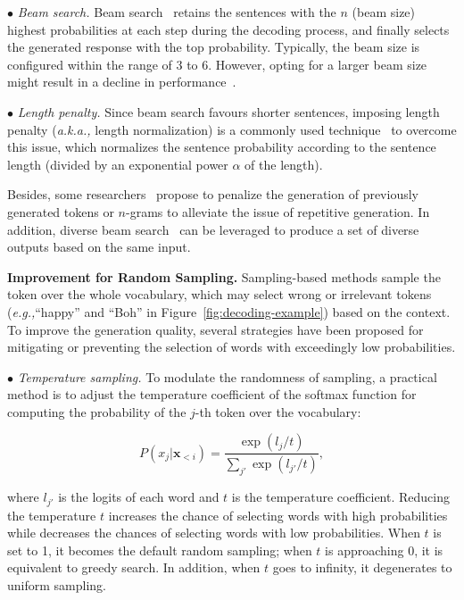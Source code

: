 $\bullet$ \emph{Beam search.} Beam search~\cite{CMU-book-1977-speech} retains the sentences with the $n$ (beam size) highest probabilities at each step during the decoding process, and finally selects the generated response with the top probability. Typically, the beam size is configured within the range of 3 to 6. However, opting for a larger beam size might result in a decline in performance~\cite{Koehn-ACL-2017-Six}.

$\bullet$ \emph{Length penalty.} Since beam search favours shorter sentences, imposing length penalty (\emph{a.k.a.,} length normalization) is a commonly used technique~\cite{Wu-arxiv-2016-Google} to overcome this issue, which normalizes the sentence probability according to the sentence length (divided by an exponential power $\alpha$ of the length).

Besides, some researchers~\cite{Paulus-iclr-2018-A} propose to penalize the generation of previously  generated tokens or $n$-grams to alleviate the issue of repetitive generation. In addition, diverse beam search~\cite{Vijayakumar-arxiv-2016-Diverse} can be leveraged to produce a set of diverse outputs based on the same input.

\textbf{Improvement for Random Sampling.} Sampling-based methods sample the token over the whole vocabulary, which may select wrong or irrelevant tokens (\emph{e.g.,}``happy'' and ``Boh'' in Figure~\ref{fig:decoding-example}) based on the context. To improve the generation quality, several strategies have been proposed for mitigating or preventing the selection of words with exceedingly low probabilities.

$\bullet$ \emph{Temperature sampling.} To modulate the randomness of sampling, a practical method is to adjust the temperature coefficient of the softmax function for computing the probability of the $j$-th token over the vocabulary:

\begin{equation}\label{eqn:temperature}
    P(x_j|\mathbf{x}_{<i}) = \frac{\exp{(l_j/t)}}{\sum_{j'} \exp{(l_{j'}/t)}},
\end{equation}

where $l_{j'}$ is the logits of each word and $t$ is the temperature coefficient.  Reducing the temperature $t$ increases the chance of selecting words with high probabilities while decreases the chances of selecting words with low probabilities. When $t$ is set to 1, it becomes the default random sampling; when $t$ is approaching 0, it is equivalent to greedy search. In addition, when $t$ goes to infinity, it degenerates to uniform sampling. 

